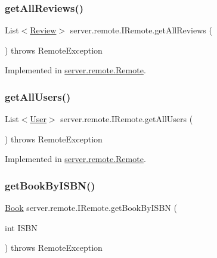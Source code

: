 \subsubsection{\texorpdfstring{get\+All\+Reviews()}{getAllReviews()}}
{\footnotesize\ttfamily List$<$\hyperlink{classserver_1_1data_1_1_review}{Review}$>$ server.\+remote.\+I\+Remote.\+get\+All\+Reviews (\begin{DoxyParamCaption}{ }\end{DoxyParamCaption}) throws Remote\+Exception}



Implemented in \hyperlink{classserver_1_1remote_1_1_remote_a22538e64b45f5f93237b455100243b44}{server.\+remote.\+Remote}.

\mbox{\label{interfaceserver_1_1remote_1_1_i_remote_a3ff8752a1911b6ca54fc4a04af90fe7a}} 
\subsubsection{\texorpdfstring{get\+All\+Users()}{getAllUsers()}}
{\footnotesize\ttfamily List$<$\hyperlink{classserver_1_1data_1_1_user}{User}$>$ server.\+remote.\+I\+Remote.\+get\+All\+Users (\begin{DoxyParamCaption}{ }\end{DoxyParamCaption}) throws Remote\+Exception}



Implemented in \hyperlink{classserver_1_1remote_1_1_remote_a3d41acc8ab7328be2082573542758f07}{server.\+remote.\+Remote}.

\mbox{\label{interfaceserver_1_1remote_1_1_i_remote_a736183bf7a57f78acf11fb78ae0f0e58}} 
\subsubsection{\texorpdfstring{get\+Book\+By\+I\+S\+B\+N()}{getBookByISBN()}}
{\footnotesize\ttfamily \hyperlink{classserver_1_1data_1_1_book}{Book} server.\+remote.\+I\+Remote.\+get\+Book\+By\+I\+S\+BN (\begin{DoxyParamCaption}\item[{int}]{I\+S\+BN }\end{DoxyParamCaption}) throws Remote\+Exception}



